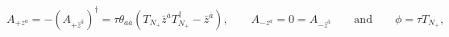 \begin{equation}\label{eq:sol-leea-nc}
 A_{+z^a}=-(A_{+\bar{z}^{\bar{a}}})^\dagger=\tau\theta_{a\bar{a}}
 (T_{N_+}\bar{z}^{\bar{a}}T_{N_+}^\dagger-\bar{z}^{\bar{a}}),\qquad
 A_{-z^a}=0=A_{-\bar{z}^{\bar{a}}}
 \qquad\text{and}\qquad\phi=\tau T_{N_+},
\end{equation} 
